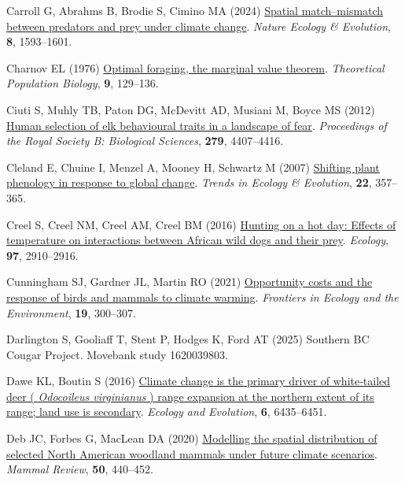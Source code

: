 \documentclass[
  12pt,
]{article}
\newlength{\cslhangindent}
\newenvironment{CSLReferences}[2] %
 {\begin{list}{}{%
  \setlength{\itemindent}{0pt}
  \setlength{\leftmargin}{0pt}
  \setlength{\parsep}{0pt}
  \ifodd #1
   \setlength{\leftmargin}{\cslhangindent}
   \setlength{\itemindent}{-1\cslhangindent}
  \fi
  \setlength{\itemsep}{#2\baselineskip}}}
 {\end{list}}
\begin{document}
\begin{CSLReferences}{1}{0}
Carroll G, Abrahms B, Brodie S, Cimino MA (2024) \href{https://doi.org/10.1038/s41559-024-02454-0}{Spatial match--mismatch between predators and prey under climate change}. \emph{Nature Ecology \& Evolution}, \textbf{8}, 1593--1601.

Charnov EL (1976) \href{https://doi.org/10.1016/0040-5809(76)90040-X}{Optimal foraging, the marginal value theorem}. \emph{Theoretical Population Biology}, \textbf{9}, 129--136.

Ciuti S, Muhly TB, Paton DG, McDevitt AD, Musiani M, Boyce MS (2012) \href{https://doi.org/10.1098/rspb.2012.1483}{Human selection of elk behavioural traits in a landscape of fear}. \emph{Proceedings of the Royal Society B: Biological Sciences}, \textbf{279}, 4407--4416.

Cleland E, Chuine I, Menzel A, Mooney H, Schwartz M (2007) \href{https://doi.org/10.1016/j.tree.2007.04.003}{Shifting plant phenology in response to global change}. \emph{Trends in Ecology \& Evolution}, \textbf{22}, 357--365.

Creel S, Creel NM, Creel AM, Creel BM (2016) \href{https://doi.org/10.1002/ecy.1568}{Hunting on a hot day: Effects of temperature on interactions between {African} wild dogs and their prey}. \emph{Ecology}, \textbf{97}, 2910--2916.

Cunningham SJ, Gardner JL, Martin RO (2021) \href{https://doi.org/10.1002/fee.2324}{Opportunity costs and the response of birds and mammals to climate warming}. \emph{Frontiers in Ecology and the Environment}, \textbf{19}, 300--307.

Darlington S, Gooliaff T, Stent P, Hodges K, Ford AT (2025) Southern {BC} {Cougar} {Project}. {Movebank} study 1620039803.

Dawe KL, Boutin S (2016) \href{https://doi.org/10.1002/ece3.2316}{Climate change is the primary driver of white‐tailed deer ( \emph{{Odocoileus} virginianus} ) range expansion at the northern extent of its range; land use is secondary}. \emph{Ecology and Evolution}, \textbf{6}, 6435--6451.

Deb JC, Forbes G, MacLean DA (2020) \href{https://doi.org/10.1111/mam.12210}{Modelling the spatial distribution of selected {North} {American} woodland mammals under future climate scenarios}. \emph{Mammal Review}, \textbf{50}, 440--452.


\end{CSLReferences}
\end{document}

